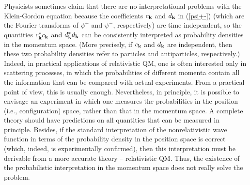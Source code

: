 \documentclass[12pt]{article}
\begin{document}
Physicists sometimes claim that there are no interpretational 
problems with the Klein-Gordon equation because the coefficients 
$c_{{\bf k}}$ and $d_{{\bf k}}$ in (\ref{psi+-}) (which are 
the Fourier transforms of $\psi^+$ and $\psi^-$, respectively) 
are time independent, so the quantities $c^*_{{\bf k}}c_{{\bf k}}$
and $d^*_{{\bf k}}d_{{\bf k}}$ can be consistently interpreted as 
probability densities in the momentum space. 
(More precisely, if $c_{{\bf k}}$ and $d_{{\bf k}}$ are independent,
then these two probability densities refer to particles and 
antiparticles, respectively.) Indeed, in practical 
applications of relativistic QM, one is often interested only in 
scattering processes, in which the probabilities of different 
momenta contain all the information that can be compared 
with actual experiments. From a practical point of view, this is 
usually enough. Nevertheless, in principle, it is possible  
to envisage an experiment in which one measures the probabilities
in the position (i.e., configuration) space, rather than that 
in the momentum space. A complete theory should have predictions on 
all quantities that can be measured in principle.
Besides, if the standard interpretation of the nonrelativistic wave function 
in terms of the probability density in the position space is 
correct (which, indeed, is experimentally confirmed), then this 
interpretation must be derivable from a more accurate theory -- 
relativistic QM. Thus, the existence of the probabilistic interpretation 
in the momentum space does not really solve the problem.
\end{document}
